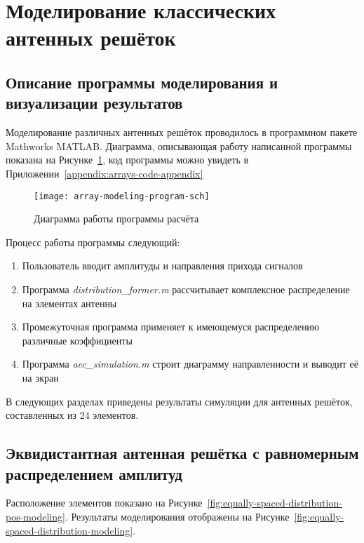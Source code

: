 \section{Моделирование классических антенных решёток}\label{sect:distributions-modeling}

\subsection{Описание программы моделирования и визуализации результатов}\label{sect:distributions-modeling-program}

Моделирование различных антенных решёток проводилось в программном пакете Mathworks MATLAB. Диаграмма, описывающая 
работу написанной программы показана на Рисунке~\ref{fig:array-modeling-program-sch}, 
код программы можно увидеть в Приложении~\ref{appendix:arrays-code-appendix}

\begin{figure}[!ht]
    \centering
    \texttt{[image: array-modeling-program-sch]}
    \caption{Диаграмма работы программы расчёта}%
    \label{fig:array-modeling-program-sch}
\end{figure}

Процесс работы программы следующий:

\begin{enumerate}
    \item Пользователь вводит амплитуды и направления прихода сигналов
    \item Программа \textit{distribution\_former.m} рассчитывает комплексное распределение на элементах антенны
    \item Промежуточная программа применяет к имеющемуся распределению различные коэффициенты 
    \item Программа \textit{aec\_simulation.m} строит диаграмму направленности и выводит её на экран
\end{enumerate}

В следующих разделах приведены результаты симуляции для антенных решёток, составленных из 24 элементов.

\subsection{Эквидистантная антенная решётка с равномерным распределением амплитуд}

Расположение элементов показано на Рисунке~\ref{fig:equally-spaced-distribution-pos-modeling}. Результаты моделирования отображены на Рисунке~\ref{fig:equally-spaced-distribution-modeling}.

